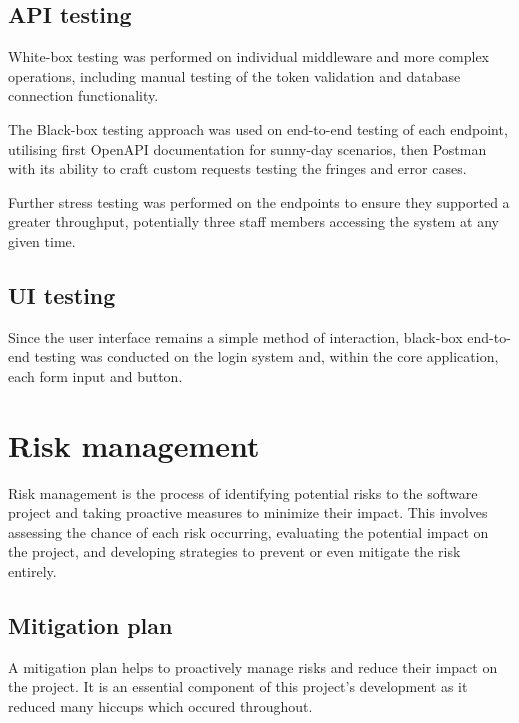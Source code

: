 \subsection{API testing}
White-box testing was performed on individual middleware and more complex operations, including manual testing of the token validation and database connection functionality.

The Black-box testing approach was used on end-to-end testing of each endpoint, utilising first OpenAPI documentation for sunny-day scenarios, then Postman with its ability to craft custom requests testing the fringes and error cases.

Further stress testing was performed on the endpoints to ensure they supported a greater throughput, potentially three staff members accessing the system at any given time. 

\subsection{UI testing}
Since the user interface remains a simple method of interaction, black-box end-to-end testing was conducted on the login system and, within the core application, each form input and button.



\section{Risk management}
Risk management is the process of identifying potential risks to the software project and taking proactive measures to minimize their impact. This involves assessing the chance of each risk occurring, evaluating the potential impact on the project, and developing strategies to prevent or even mitigate the risk entirely.

\subsection{Mitigation plan}

A mitigation plan helps to proactively manage risks and reduce their impact on the project. It is an essential component of this project's development as it reduced many hiccups which occured throughout.

